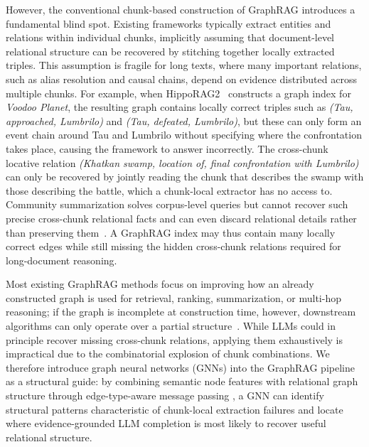 \documentclass[11pt]{article}
\begin{document}
{However, the conventional chunk-based construction of GraphRAG introduces a fundamental blind spot. Existing frameworks typically extract entities and relations within individual chunks, implicitly assuming that document-level relational structure can be recovered by stitching together locally extracted triples. This assumption is fragile for long texts, where many important relations, such as alias resolution and causal chains, depend on evidence distributed across multiple chunks. For example, when HippoRAG2~\citep{gutierrez2025rag} constructs a graph index for \textit{Voodoo Planet}, the resulting graph contains locally correct triples such as \textit{(Tau, approached, Lumbrilo)} and \textit{(Tau, defeated, Lumbrilo)}, but these can only form an event chain around Tau and Lumbrilo without specifying where the confrontation takes place, causing the framework to answer incorrectly. The cross-chunk locative relation \textit{(Khatkan swamp, location of, final confrontation with Lumbrilo)} can only be recovered by jointly reading the chunk that describes the swamp with those describing the battle, which a chunk-local extractor has no access to. Community summarization solves corpus-level queries but cannot recover such precise cross-chunk relational facts and can even discard relational details rather than preserving them~\citep{han2025rag}. A GraphRAG index may thus contain many locally correct edges while still missing the hidden cross-chunk relations required for long-document reasoning.}

{Most existing GraphRAG methods focus on improving how an already constructed graph is used for retrieval, ranking, summarization, or multi-hop reasoning; if the graph is incomplete at construction time, however, downstream algorithms can only operate over a partial structure~\citep{yang2026graph}. While LLMs could in principle recover missing cross-chunk relations, applying them exhaustively is impractical due to the combinatorial explosion of chunk combinations. We therefore introduce graph neural networks (GNNs) into the GraphRAG pipeline as a structural guide: by combining semantic node features with relational graph structure through edge-type-aware message passing \citep{gilmer2017neural,schlichtkrull2018modeling}, a GNN can identify structural patterns characteristic of chunk-local extraction failures and locate where evidence-grounded LLM completion is most likely to recover useful relational structure.}
\end{document}
